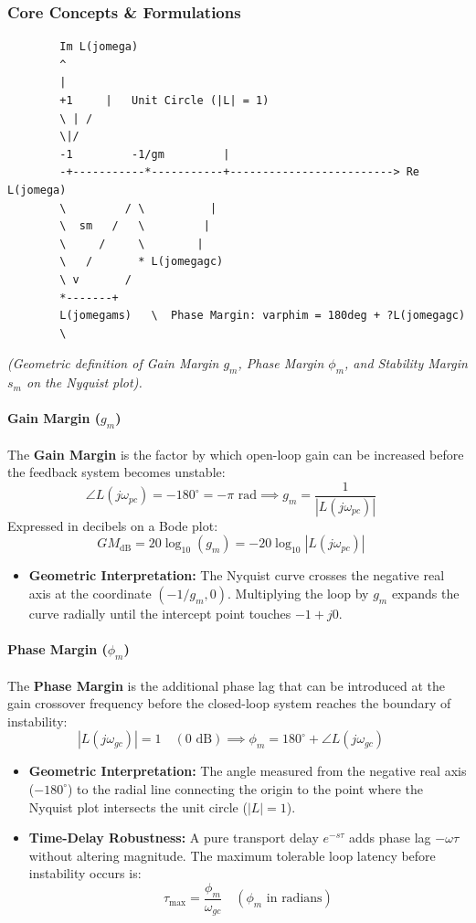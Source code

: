 \documentclass[12pt,onecolumn,twoside ]{article}
\begin{document}
	\subsubsection{Core Concepts \& Formulations}
	\begin{lstlisting}
		Im L(jomega)
		^
		|
		+1     |   Unit Circle (|L| = 1)
		\ | /
		\|/
		-1         -1/gm         |
		-+-----------*-----------+-------------------------> Re L(jomega)
		\         / \          |
		\  sm   /   \         |
		\     /     \        |
		\   /       * L(jomegagc)
		\ v       /
		*-------+
		L(jomegams)   \  Phase Margin: varphim = 180deg + ?L(jomegagc)
		\
	\end{lstlisting}
	\textit{(Geometric definition of Gain Margin $g_m$, Phase Margin $\phi_m$, and Stability Margin $s_m$ on the Nyquist plot).}
	\paragraph{Gain Margin ($g_m$)}
	The \textbf{Gain Margin} is the factor by which open-loop gain can be increased before the feedback system becomes unstable: \[
	\angle L(j\omega_{pc}) = -180^\circ = -\pi \text{ rad} \implies g_m = \frac{1}{|L(j\omega_{pc})|} \quad
	\] Expressed in decibels on a Bode plot: \[
	GM_{\text{dB}} = 20\log_{10}(g_m) = -20\log_{10}|L(j\omega_{pc})| \quad
	\]
	\begin{itemize}
		\item
		\textbf{Geometric Interpretation:} The Nyquist curve crosses the negative real axis at the coordinate $(-1/g_m, 0)$. Multiplying the loop by $g_m$ expands the curve radially until the intercept point touches $-1 + j0$.
	\end{itemize}
	\paragraph{Phase Margin ($\phi_m$)}
	The \textbf{Phase Margin} is the additional phase lag that can be introduced at the gain crossover frequency before the closed-loop system reaches the boundary of instability: \[
	|L(j\omega_{gc})| = 1 \quad (0\text{ dB}) \implies \phi_m = 180^\circ + \angle L(j\omega_{gc}) \quad
	\]
	\begin{itemize}
		\item
		\textbf{Geometric Interpretation:} The angle measured from the negative real axis ($-180^\circ$) to the radial line connecting the origin to the point where the Nyquist plot intersects the unit circle ($|L| = 1$).
		\item
		\textbf{Time-Delay Robustness:} A pure transport delay $e^{-s\tau}$ adds phase lag $-\omega \tau$ without altering magnitude. The maximum tolerable loop latency before instability occurs is: \[
		\tau_{\text{max}} = \frac{\phi_m}{\omega_{gc}} \quad (\phi_m \text{ in radians})
		\]
	\end{itemize}
\end{document}
